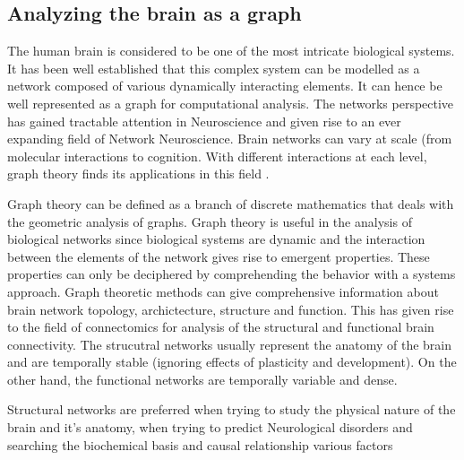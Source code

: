 \documentclass[msthesis.tex]{subfiles}
\begin{document}
\subsection{Analyzing the brain as a graph}
\label{sec:braingraph}
The human brain is considered to be one of the most intricate biological systems. It has been well established that this complex system can be modelled as a network composed of various dynamically interacting elements. It can hence be well represented as a graph for computational analysis. The networks perspective has gained tractable attention in Neuroscience and given rise to an ever expanding field of Network Neuroscience. Brain networks can vary at scale (from molecular interactions to cognition. With different interactions at each level, graph theory finds its applications in this field \cite{sporns2018graph}. 

Graph theory can be defined as a branch of discrete mathematics that deals with the geometric analysis of graphs. Graph theory is useful in the analysis of biological networks since biological systems are dynamic and the interaction between the elements of the network gives rise to emergent properties. These properties can only be deciphered by comprehending the behavior with a systems approach. Graph theoretic methods can give comprehensive information about brain network topology, archictecture, structure and function. This has given rise to the field of connectomics \cite{sporns2005human} for analysis of the structural and functional brain connectivity. The strucutral networks usually represent the anatomy of the brain and are temporally stable (ignoring effects of plasticity and development). On the other hand, the functional networks are temporally variable and dense.

Structural networks are preferred when trying to study the physical nature of the brain and it's anatomy, when trying to predict Neurological disorders and searching the biochemical basis and causal relationship various factors

\end{document}
